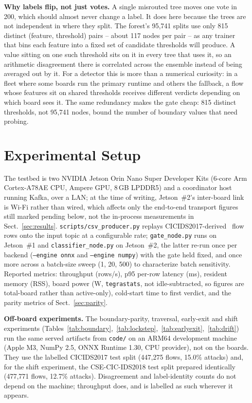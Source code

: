\documentclass[runningheads]{llncs}
\begin{document}
\textbf{Why labels flip, not just votes.} A single misrouted tree moves one vote in 200, which should almost never change a label. It does here because the trees are not independent in where they split. The forest's 95{,}741 splits use only 815 distinct (feature, threshold) pairs -- about 117 nodes per pair -- as any trainer that bins each feature into a fixed set of candidate thresholds will produce. A value sitting on one such threshold sits on it in every tree that uses it, so an arithmetic disagreement there is correlated across the ensemble instead of being averaged out by it. For a detector this is more than a numerical curiosity: in a fleet where some boards run the primary runtime and others the fallback, a flow whose features sit on shared thresholds receives different verdicts depending on which board sees it. The same redundancy makes the gate cheap: 815 distinct thresholds, not 95{,}741 nodes, bound the number of boundary values that need probing.

\section{Experimental Setup}

The testbed is two NVIDIA Jetson Orin Nano Super Developer Kits (6-core Arm Cortex-A78AE CPU, Ampere GPU, 8\,GB LPDDR5) and a coordinator host running Kafka, over a LAN; at the time of writing, Jetson~\#2's inter-board link is Wi-Fi rather than wired, which affects only the end-to-end transport figures still marked pending below, not the in-process measurements in Sect.~\ref{sec:results}. \texttt{scripts/csv\_producer.py} replays CICIDS2017-derived~\cite{sharafaldin2018toward} flow rows onto the input topic at a configurable rate; \texttt{gate\_node.py} runs on Jetson~\#1 and \texttt{classifier\_node.py} on Jetson~\#2, the latter re-run once per backend (\texttt{--engine onnx} and \texttt{--engine numpy}) with the gate held fixed, and once more across a batch-size sweep (1, 20, 500) to characterize batch sensitivity. Reported metrics: throughput (rows/s), p95 per-row latency (ms), resident memory (RSS), board power (W, \texttt{tegrastats}, not idle-subtracted, so figures are total-board rather than active-only), cold-start time to first verdict, and the parity metrics of Sect.~\ref{sec:parity}.

\textbf{Off-board experiments.} The boundary-parity, traversal, early-exit and shift experiments (Tables~\ref{tab:boundary},~\ref{tab:lockstep},~\ref{tab:earlyexit},~\ref{tab:drift}) run the same served artifacts from \texttt{code/} on an ARM64 development machine (Apple M3, NumPy 2.5, ONNX Runtime 1.30, CPU provider), not on the boards. They use the labelled CICIDS2017 test split (447{,}275 flows, 15.0\% attacks) and, for the shift experiment, the CSE-CIC-IDS2018 test split prepared identically (477{,}771 flows, 12.7\% attacks). Disagreement and label-identity counts do not depend on the machine; throughput does, and is labelled as such wherever it appears.
\end{document}
